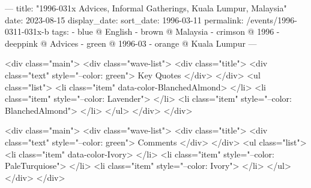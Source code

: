 ---
title: "1996-031x Advices, Informal Gatherings, Kuala Lumpur, Malaysia"
date: 2023-08-15
display_date: 
sort_date: 1996-03-11
permalink: /events/1996-0311-031x-b
tags:
  - blue @ English
  - brown @ Malaysia
  - crimson @ 1996
  - deeppink @ Advices
  - green @ 1996-03
  - orange @ Kuala Lumpur
---

<div class="main">
  <div class="wave-list">
    <div class="title">
      <div class="text" style="--color: green">
        Key Quotes
      </div>
    </div>
    <ul class="list">
        <li class="item" data-color-BlanchedAlmond>
        </li>
        <li class="item" style="--color: Lavender">
        </li>
        <li class="item" style="--color: BlanchedAlmond">
        </li>
      </ul>
  </div>
</div>

<div class="main">
  <div class="wave-list">
    <div class="title">
      <div class="text" style="--color: green">
        Comments
      </div>
    </div>
    <ul class="list">
        <li class="item" data-color-Ivory>
        </li>
        <li class="item" style="--color: PaleTurquiose">
        </li>
        <li class="item" style="--color: Ivory">
        </li>
      </ul>
  </div>
</div>